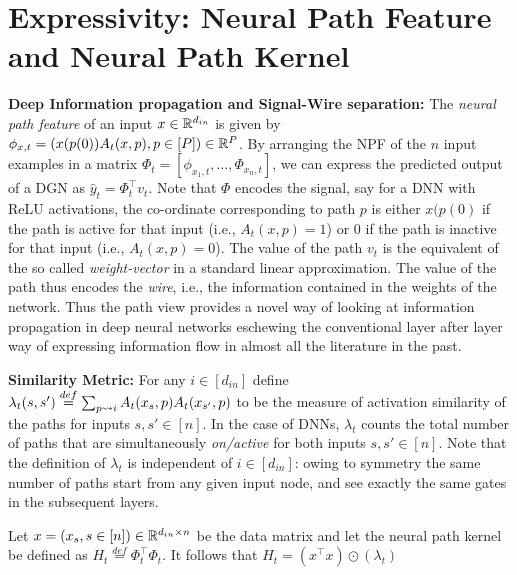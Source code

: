 \section{Expressivity: Neural Path Feature and Neural Path Kernel}
\textbf{Deep Information propagation and Signal-Wire separation:} The \emph{neural path feature} of an input $x\in \mathbb{R}^{d_{in}}$ is given by $\phi_{x,t}=(x(p(0))A_t(x,p) ,p\in[P])\in\mathbb{R}^P$. By arranging the NPF of the $n$ input examples in a matrix $\Phi_t=\left[\phi_{x_1,t},\ldots, \Phi_{x_n,t}\right]$, we can express the predicted output of a DGN as $\hat{y}_t=\Phi_t^\top v_t$. Note that $\Phi$ encodes the signal, say for a DNN with ReLU activations, the co-ordinate corresponding to path $p$ is either $x(p(0)$ if the path is active for that input (i.e., $A_t(x,p)=1$) or $0$ if the path is inactive for that input  (i.e., $A_t(x,p)=0$). The value of the path $v_t$ is the equivalent of the so called \emph{weight-vector} in a standard linear approximation. The value of the path thus encodes the \emph{wire}, i.e., the information contained in the weights of the network. Thus the path view provides a novel way of looking at information propagation in deep neural networks eschewing the conventional layer after layer way of expressing information flow in almost all the literature in the past.

\textbf{Similarity Metric:} For any $i\in [d_{in}]$ define $\lambda_t(s,s')\stackrel{def}{=}\sum_{p\rightsquigarrow i} A_t(x_s,p) A_t(x_{s'},p)$ to be the measure of activation similarity of the paths for inputs $s,s'\in[n]$. In the case of DNNs, $\lambda_t$ counts the total number of paths that are simultaneously \emph{on/active} for both inputs $s,s'\in[n]$. Note that the definition of $\lambda_t$ is independent of $i\in [d_{in}]$: owing to symmetry the same number of paths start from any given input node, and see exactly the same gates in the subsequent layers.

\begin{lemma} Let $x=(x_s,s\in [n])\in\mathbb{R}^{d_{in}\times n}$ be the data matrix and let the neural path kernel be defined as $H_t\stackrel{def}=\Phi^\top_t\Phi_t$. It follows that $H_t= (x^\top x)\odot(\lambda_t)$ \end{lemma}






